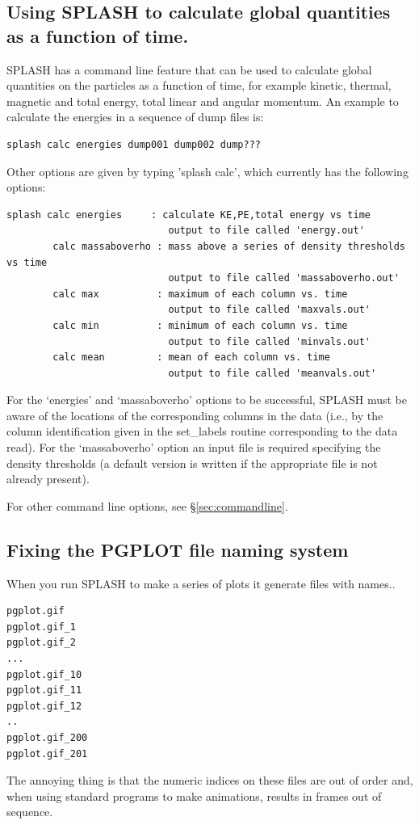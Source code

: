 \documentclass[a4paper,10pt]{article}
\newcommand{\splash}{\textsc{SPLASH }}
\begin{document}
\subsection{Using \splash to calculate global quantities as a function of time.}
 \splash has a command line feature that can be used to calculate global quantities on the particles as a function of time, for example kinetic, thermal, magnetic and total energy, total linear and angular momentum. An example to calculate the energies in a sequence of dump files is:
\begin{verbatim}
splash calc energies dump001 dump002 dump???
\end{verbatim}
Other options are given by typing 'splash calc', which currently has the following options:
\begin{verbatim}
splash calc energies     : calculate KE,PE,total energy vs time
                            output to file called 'energy.out'
        calc massaboverho : mass above a series of density thresholds vs time
                            output to file called 'massaboverho.out'
        calc max          : maximum of each column vs. time
                            output to file called 'maxvals.out'
        calc min          : minimum of each column vs. time
                            output to file called 'minvals.out'
        calc mean         : mean of each column vs. time
                            output to file called 'meanvals.out'
\end{verbatim}
For the `energies' and `massaboverho' options to be successful, \splash must be aware of the locations of the corresponding columns in the data (i.e., by the column identification given in the set\_labels routine corresponding to the data read). For the `massaboverho' option an input file is required specifying the density thresholds (a default version is written if the appropriate file is not already present).
 
 For other command line options, see \S\ref{sec:commandline}.

\subsection{Fixing the PGPLOT file naming system} 
\label{sec:fixpgplotnames}

When you run \splash to make a series of plots it generate files with names..
\begin{verbatim}
pgplot.gif
pgplot.gif_1
pgplot.gif_2
...
pgplot.gif_10
pgplot.gif_11
pgplot.gif_12
..
pgplot.gif_200
pgplot.gif_201
\end{verbatim}
The annoying thing is that the numeric indices on these files are out of order and, when using
standard programs to make animations, results in frames out of sequence.
\end{document}
